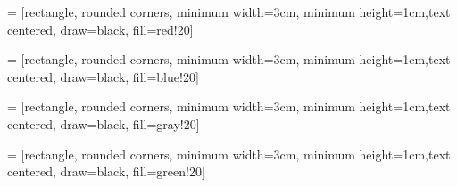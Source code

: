 \documentclass{minimal}
\begin{document}
\newpage

\newcommand{\data}{data \nodepart{second} \phantom{null}}

 = [rectangle, rounded corners, minimum width=3cm, minimum height=1cm,text centered, draw=black, fill=red!20]

 = [rectangle, rounded corners, minimum width=3cm, minimum height=1cm,text centered, draw=black, fill=blue!20]

 = [rectangle, rounded corners, minimum width=3cm, minimum height=1cm,text centered, draw=black, fill=gray!20]

 = [rectangle, rounded corners, minimum width=3cm, minimum height=1cm,text centered, draw=black, fill=green!20]
\end{document}
